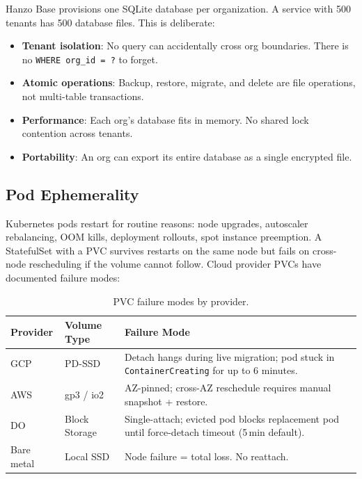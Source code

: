 \documentclass[11pt,a4paper]{article}
\begin{document}
Hanzo Base provisions one SQLite database per organization. A service
with 500 tenants has 500 database files. This is deliberate:

\begin{itemize}[nosep]
  \item \textbf{Tenant isolation}: No query can accidentally cross org
    boundaries. There is no \texttt{WHERE org\_id = ?} to forget.
  \item \textbf{Atomic operations}: Backup, restore, migrate, and
    delete are file operations, not multi-table transactions.
  \item \textbf{Performance}: Each org's database fits in memory. No
    shared lock contention across tenants.
  \item \textbf{Portability}: An org can export its entire database as
    a single encrypted file.
\end{itemize}

\subsection{Pod Ephemerality}

Kubernetes pods restart for routine reasons: node upgrades, autoscaler
rebalancing, OOM kills, deployment rollouts, spot instance preemption.
A StatefulSet with a PVC survives restarts on the same node but fails
on cross-node rescheduling if the volume cannot follow. Cloud provider
PVCs have documented failure modes:

\begin{table}[H]
\centering
\caption{PVC failure modes by provider.}
\label{tab:pvc-failures}
\begin{tabular}{@{}llp{6.5cm}@{}}
\toprule
\textbf{Provider} & \textbf{Volume Type} & \textbf{Failure Mode} \\
\midrule
GCP & PD-SSD & Detach hangs during live migration; pod stuck in
  \texttt{ContainerCreating} for up to 6 minutes. \\
AWS & gp3 / io2 & AZ-pinned; cross-AZ reschedule requires manual
  snapshot + restore. \\
DO & Block Storage & Single-attach; evicted pod blocks replacement pod
  until force-detach timeout (5\,min default). \\
Bare metal & Local SSD & Node failure = total loss. No reattach. \\
\bottomrule
\end{tabular}
\end{table}
\end{document}
